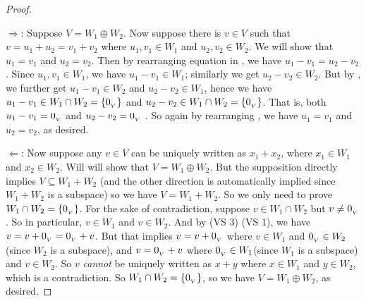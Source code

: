 \begin{proof}\ 

\(\Longrightarrow\): Suppose \(V = W_1 \oplus W_2\).
Now suppose there is \(v \in V\) such that \(v = u_1 + u_2 = v_1 + v_2\)  where \(u_1, v_1 \in W_1\) and \(u_2, v_2 \in W_2\).
We will show that \(u_1 = v_1\) and \(u_2 = v_2\).
Then by rearranging equation in , we have \(u_1 - v_1 = u_2 - v_2\) .
Since \(u_1, v_1 \in W_1\), we have \(u_1 - v_1 \in W_1\); similarly we get \(u_2 - v_2 \in W_2\).
But by , we further get \(u_1 - v_1 \in W_2\) and \(u_2 - v_2 \in W_1\), hence we have \(u_1 - v_1 \in W_1 \cap W_2 = \{ 0_{_V} \}\) and \(u_2 - v_2 \in W_1 \cap W_2 = \{ 0_{_V} \}\).
That is, both \(u_1 - v_1 = 0_{_V}\) and \(u_2 - v_2 = 0_{_V}\) .
So again by rearranging , we have \(u_1 = v_1\) and \(u_2 = v_2\), as desired.

\(\Longleftarrow\): Now suppose any \(v \in V\) can be uniquely written as \(x_1 + x_2\), where \(x_1 \in W_1\) and \(x_2 \in W_2\).
Will will show that \(V = W_1 \oplus W_2\).
But the supposition directly implies \(V \subseteq W_1 + W_2\) (and the other direction is automatically implied since \(W_1 + W_2\) is a subspace) so we have \(V = W_1 + W_2\).
So we only need to prove \(W_1 \cap W_2 = \{ 0_{_V} \}\).
For the sake of contradiction, suppose \(v \in W_1 \cap W_2\) but \(v \ne 0_{_V}\).
So in particular, \(v \in W_1\) and \(v \in W_2\).
And by (VS 3) (VS 1), we have \(v = v + 0_{_V} = 0_{_V} + v\).
But that implies \(v = v + 0_{_V}\) where \(v \in W_1\) and \(0_{_V} \in W_2\)(since \(W_2\) is a subspace), and \(v = 0_{_V} + v\) where \(0_{_V} \in W_1\)(since \(W_1\) is a subspace) and \(v \in W_2\).
So \(v\) \emph{cannot} be uniquely written as \(x + y\) where \(x \in W_1\) and \(y \in W_2\), which is a contradiction.
So \(W_1 \cap W_2 = \{ 0_{_V} \}\), so we have \(V = W_1 \oplus W_2\), as desired.
\end{proof}

